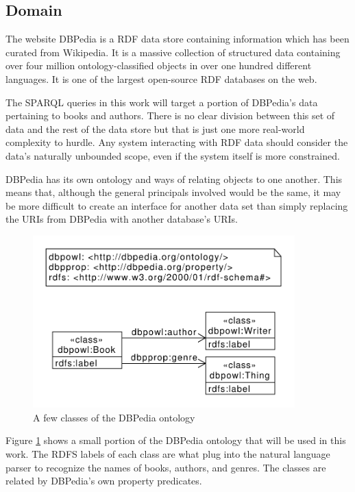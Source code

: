 \documentclass[11pt]{article}
\begin{document}
\subsection{Domain}

The website DBPedia\cite{dbpedia,dbpedia-swj} is a RDF data store containing information 
which has been curated from Wikipedia. It is a massive collection of structured data
containing over four million ontology-classified objects in over one hundred different
languages. It is one of the largest open-source RDF databases on the web.

The SPARQL queries in this work will target a portion of DBPedia's
data pertaining to books and authors. There is no clear division between this set of
data and the rest of the data store but that is just one more real-world complexity
to hurdle. Any system interacting with RDF data should consider
the data's naturally unbounded scope, even if the system itself is more constrained.

DBPedia has its own ontology and ways of relating objects to one another. This means
that, although the general principals involved would be the same, 
it may be more difficult to create an interface for another data set than simply 
replacing the URIs from DBPedia with another database's URIs.

\begin{figure}[h!]
    \centering
    \includegraphics[width=0.9\textwidth,natwidth=1,natheight=1]{umlet/book_ontology.pdf}
    \caption{A few classes of the DBPedia ontology}
    \label{fig:book_ontology}
\end{figure}

Figure \ref{fig:book_ontology} shows a small portion of the DBPedia ontology that
will be used in this work. The RDFS labels of each class are what plug into the
natural language parser to recognize the names of books, authors, and genres. 
The classes are related by DBPedia's own property predicates.
\end{document}

